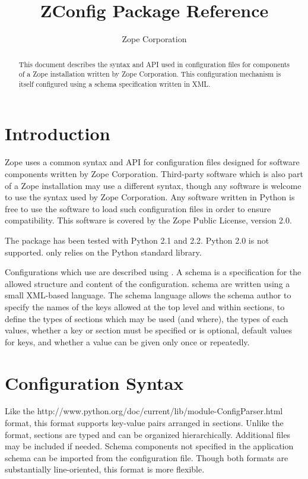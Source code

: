 \documentclass{howto}
\title{ZConfig Package Reference}
\author{Zope Corporation}
\begin{document}
\maketitle

\begin{abstract}
\noindent
This document describes the syntax and API used in configuration files
for components of a Zope installation written by Zope Corporation.  This
configuration mechanism is itself configured using a schema specification
written in XML.
\end{abstract}

\tableofcontents


\section{Introduction \label{intro}}

Zope uses a common syntax and API for configuration files designed for
software components written by Zope Corporation.  Third-party software
which is also part of a Zope installation may use a different syntax,
though any software is welcome to use the syntax used by Zope
Corporation.  Any software written in Python is free to use the
 software to load such configuration files in order to
ensure compatibility.  This software is covered by the Zope Public
License, version 2.0.

The  package has been tested with Python 2.1 and 2.2.
Python 2.0 is not supported.
 only relies on the Python standard library.

Configurations which use  are described using
.  A schema is a specification for the allowed structure
and content of the configuration.   schema are written
using a small XML-based language.  The schema language allows the
schema author to specify the names of the keys allowed at the top
level and within sections, to define the types of sections which may
be used (and where), the types of each values, whether a key or
section must be specified or is optional, default values for keys, and
whether a value can be given only once or repeatedly.


\section{Configuration Syntax \label{syntax}}

Like the 
{http://www.python.org/doc/current/lib/module-ConfigParser.html}
format, this format supports key-value pairs arranged in sections.
Unlike the  format, sections are typed and can be
organized hierarchically.
Additional files may be included if needed.  Schema components not
specified in the application schema can be imported from the
configuration file.  Though both formats are substantially
line-oriented, this format is more flexible.
\end{document}
